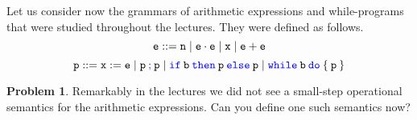 \documentclass[a4paper, 11pt]{article}
\theoremstyle{definition}
\newtheorem{problem}{Problem}
\newcommand{\blue}[1]{\textcolor{blue}{#1}}
\begin{document}
        Let us consider now the grammars of arithmetic expressions and while-programs 
        that were studied throughout the lectures. They were defined as follows.
        \[
                \mathtt{e} ::=  \mathtt{n}  \mid \mathtt{e \cdot e}
                \mid  \mathtt{x}  \mid \mathtt{e + e}
        \]
        \[
                \prog{p} ::= \mathtt{x} := \mathtt{e} \mid
        	\mathtt{p \> \blue{;} \> p} \mid
        	\mathtt{\blue{if} \> b \> \blue{then} \> p \> \blue{else} \> p} \mid
        	\mathtt{\blue{while} \> b \> \blue{do} \> \{ \> p \> \}}
        \]
        \begin{problem}
                Remarkably in the lectures we did not see a small-step
                operational semantics for the arithmetic expressions. Can you
                define one such semantics now?
        \end{problem}
\end{document}
